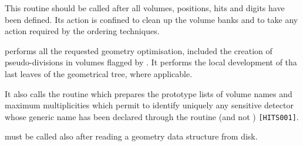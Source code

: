          
         

This routine should be called after all volumes, positions,
hits and digits have been defined. Its action is confined to
clean up the volume banks and to take any action required by the
ordering techniques. 

 performs all the requested geometry optimisation, included
the creation of pseudo-divisions in volumes flagged by .
It performs the local development of tha last leaves of the
geometrical tree, where applicable.

It also calls the routine  which prepares the prototype lists of
volume names and maximum multiplicities which permit to identify uniquely
any sensitive detector whose generic name has been declared through the
routine  (and not ) {\tt [HITS001]}.

 must be called also after reading a geometry data structure
from disk.
